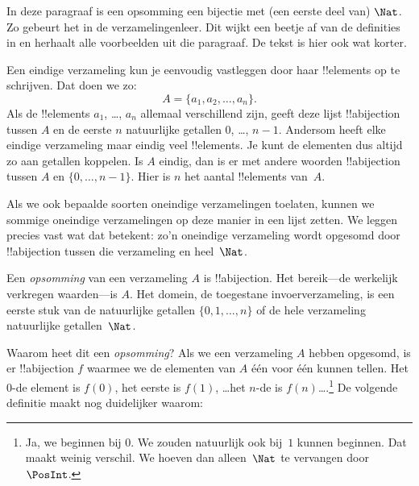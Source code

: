 \documentclass[../../../include/open-logic-section]{subfiles}
\begin{document}


\begin{editorial}
  In deze paragraaf is een opsomming een bijectie met (een eerste deel
  van) $\Nat$. Zo gebeurt het in de verzamelingenleer. Dit wijkt een
  beetje af van de definities in  en herhaalt alle
  voorbeelden uit die paragraaf. De tekst is hier ook wat korter.
\end{editorial}

Een eindige verzameling kun je eenvoudig vastleggen door haar
!!{element}s op te schrijven. Dat doen we zo:
\[
  A = \{a_1, a_2, \ldots, a_n\}.
\]
Als de !!{element}s $a_1$, \dots, $a_n$ allemaal verschillend zijn,
geeft deze lijst !!a{bijection} tussen $A$ en de eerste $n$
natuurlijke getallen $0$, \dots, $n-1$. Andersom heeft elke eindige
verzameling maar eindig veel !!{element}s. Je kunt de elementen dus
altijd zo aan getallen koppelen. Is $A$ eindig, dan is er met andere
woorden !!a{bijection} tussen $A$ en $\{0, \dots, n-1\}$. Hier is $n$
het aantal !!{element}s van~$A$.

Als we ook bepaalde soorten oneindige verzamelingen toelaten, kunnen
we sommige oneindige verzamelingen op deze manier in een lijst zetten.
We leggen precies vast wat dat betekent: zo'n oneindige verzameling
wordt opgesomd door !!a{bijection} tussen die verzameling en
heel~$\Nat$.

\begin{defn}
Een \emph{opsomming} van een verzameling $A$ is !!a{bijection}. Het
bereik---de werkelijk verkregen waarden---is $A$. Het domein, de
toegestane invoerverzameling, is een eerste stuk van de natuurlijke
getallen $\{0, 1, \ldots, n\}$ {of} de hele verzameling natuurlijke
getallen~$\Nat$.
\end{defn}

\begin{explain}
Waarom heet dit een \emph{opsomming}? Als we een verzameling $A$
hebben opgesomd, is er !!a{bijection} $f$ waarmee we de elementen van
$A$ één voor één kunnen tellen. Het $0$-de element is $f(0)$, het
eerste is $f(1)$, \ldots het $n$-de is $f(n)$\ldots.\footnote{Ja, we
beginnen bij $0$. We zouden natuurlijk ook bij~$1$ kunnen beginnen.
Dat maakt weinig verschil. We hoeven dan alleen~$\Nat$ te vervangen
door~$\PosInt$.} De volgende definitie maakt nog duidelijker waarom:
\end{explain}
\end{document}
